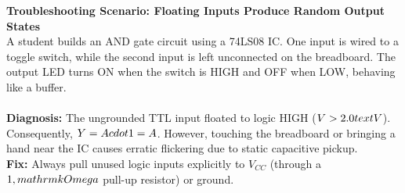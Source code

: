 \textbf{Troubleshooting Scenario: Floating Inputs Produce Random Output States}\\
A student builds an AND gate circuit using a 74LS08 IC. One input is wired to a toggle switch, while the second input is left unconnected on the breadboard. The output LED turns ON when the switch is HIGH and OFF when LOW, behaving like a buffer.\\\\
\textbf{Diagnosis:} The ungrounded TTL input floated to logic HIGH ($V > 2.0\\text{V}$). Consequently, $Y = A \\cdot 1 = A$. However, touching the breadboard or bringing a hand near the IC causes erratic flickering due to static capacitive pickup.\\
\textbf{Fix:} Always pull unused logic inputs explicitly to $V_{CC}$ (through a $1\\,\\mathrm{k}\\Omega$ pull-up resistor) or ground.
\vspace{4mm}
